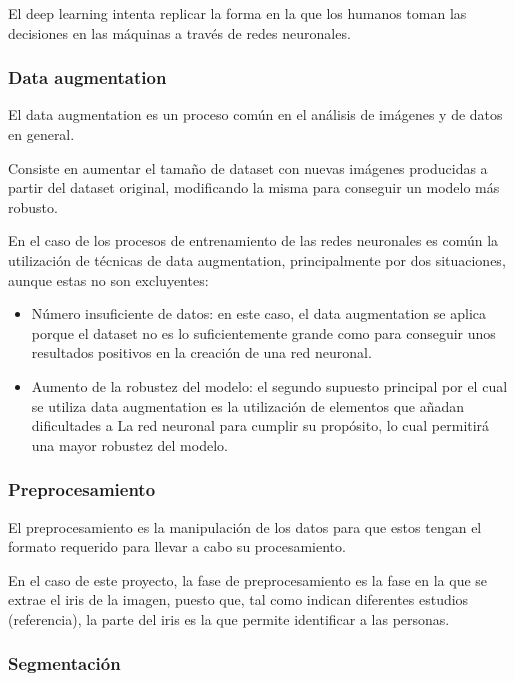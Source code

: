 El deep learning intenta replicar la forma en la que los humanos toman las decisiones en las máquinas a través de redes neuronales.

\subsubsection{Data augmentation}\label{dataaugmentation}

El data augmentation es un proceso común en el análisis de imágenes y de datos en general. 

Consiste en aumentar el tamaño de dataset con nuevas imágenes producidas a partir del dataset original, modificando la misma para conseguir un modelo más robusto.	

En el caso de los procesos de entrenamiento de las redes neuronales es común
la utilización de técnicas de data augmentation, principalmente por dos situaciones, aunque estas no son excluyentes:

\begin{itemize}
	\item Número insuficiente de datos: en este caso, el data augmentation se aplica porque el dataset no es lo suficientemente grande como para conseguir unos resultados 
positivos en la creación de una red neuronal.
	\item Aumento de la robustez del modelo: el segundo supuesto principal por el cual se utiliza data augmentation es la utilización de elementos que añadan dificultades a La
red neuronal para cumplir su propósito, lo cual permitirá una mayor robustez del modelo.
\end{itemize}

\subsubsection{Preprocesamiento}

El preprocesamiento es la manipulación de los datos para que estos tengan el formato requerido para llevar a cabo su procesamiento.

En el caso de este proyecto, la fase de preprocesamiento es la fase en la que se extrae el iris de la imagen, puesto que, tal como indican diferentes estudios (referencia), la parte del iris es la que 
permite identificar a las personas.

\subsubsection{Segmentación}

